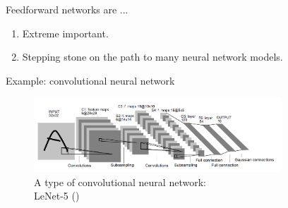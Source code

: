 \documentclass[10pt]{beamer}
\begin{document}
	\begin{frame}{Feedforward networks are ...}
		\onslide<1->
		\begin{enumerate}
			\item Extreme important.
			\item Stepping stone on the path to many neural network models.
		\end{enumerate}
		
		\begin{exampleblock}{Example: convolutional neural network}
			\begin{figure}
				\includegraphics<2->[width=25em]{figures/lenet-5.png}
				\caption{A type of convolutional neural network: \\ LeNet-5 (\citet{lecun1998gradient})}
			\end{figure}
		\end{exampleblock}
	\end{frame}
\end{document}
